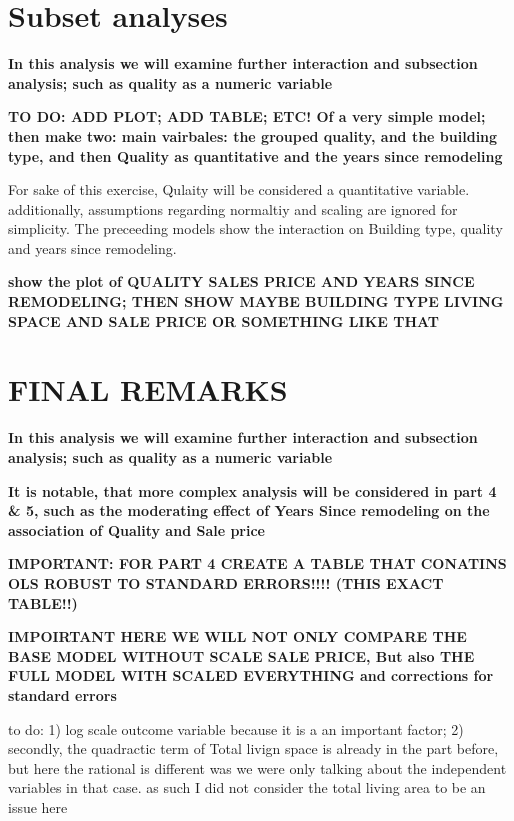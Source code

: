 \documentclass[a4paper]{article}
\begin{document}
\section{Subset analyses}
\textbf{In this analysis we will examine further interaction and subsection analysis; such as quality as a numeric variable}



\textbf{TO DO: ADD PLOT; ADD TABLE; ETC! Of a very simple model; then make two: main vairbales: the grouped quality, and the building type, and then Quality as quantitative and the years since remodeling}

For sake of this exercise, Qulaity will be considered a quantitative variable. additionally, assumptions regarding normaltiy and scaling are ignored for simplicity. The preceeding models show the interaction on Building type, quality and years since remodeling. 

\textbf{show the plot of QUALITY SALES PRICE AND YEARS SINCE REMODELING; THEN SHOW MAYBE BUILDING TYPE LIVING SPACE AND SALE PRICE OR SOMETHING LIKE THAT}






\section{FINAL REMARKS}
\textbf{In this analysis we will examine further interaction and subsection analysis; such as quality as a numeric variable}




\textbf{It is notable, that more complex analysis will be considered in part 4 \& 5, such as the moderating effect of Years Since remodeling on the association of Quality and Sale price}

\textbf{IMPORTANT: FOR PART 4 CREATE A TABLE THAT CONATINS OLS ROBUST TO STANDARD ERRORS!!!! (THIS EXACT TABLE!!)}

\textbf{IMPOIRTANT HERE WE WILL NOT ONLY COMPARE THE BASE MODEL WITHOUT SCALE SALE PRICE, But also THE FULL MODEL WITH SCALED EVERYTHING and corrections for standard errors }

to do: 1) log scale outcome variable because it is a an important factor; 2) secondly, the quadractic term of Total livign space is already in the part before, but here the rational is different was we were only talking about the independent variables in that case. as such I did not consider the total living area to be an issue here 
\end{document}
